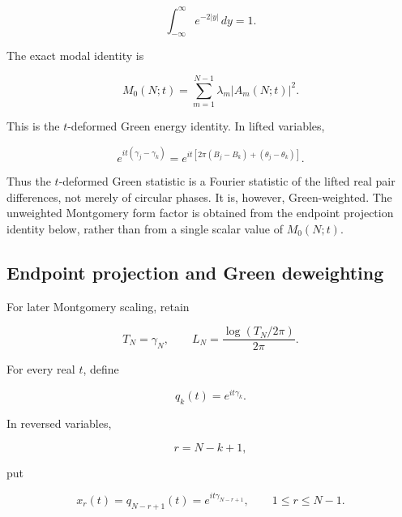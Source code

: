 \documentclass[11pt]{amsart}
\numberwithin{equation}{section}
\theoremstyle{plain}
\theoremstyle{definition}
\theoremstyle{remark}
\begin{document}
\begin{equation}
\int_{-\infty}^{\infty}e^{-2|y|}\,dy=1.
\end{equation}

The exact modal identity is

\begin{equation}
M_0(N;t)
=
\sum_{m=1}^{N-1}
\lambda_m
|A_m(N;t)|^2.
\label{eq:t_deformed_green_modal_identity}
\end{equation}

This is the \(t\)-deformed Green energy identity. In lifted variables,

\begin{equation}
e^{it(\gamma_j-\gamma_k)}
=
e^{it[2\pi(B_j-B_k)+(\theta_j-\theta_k)]}.
\label{eq:t_family_lifted_fourier_phase}
\end{equation}

Thus the \(t\)-deformed Green statistic is a Fourier statistic of the
lifted real pair differences, not merely of circular phases. It is,
however, Green-weighted. The unweighted Montgomery form factor is
obtained from the endpoint projection identity below, rather than from a
single scalar value of \(M_0(N;t)\).

\subsection{Endpoint projection and Green deweighting}
\label{subsec:endpoint_projection_green_deweighting}

For later Montgomery scaling, retain

\begin{equation}
T_N=\gamma_N,
\qquad
L_N=\frac{\log(T_N/2\pi)}{2\pi}.
\label{eq:form_factor_TN_LN}
\end{equation}

For every real \(t\), define

\begin{equation}
q_k(t)=e^{it\gamma_k}.
\label{eq:form_factor_qk_t}
\end{equation}

In reversed variables,

\begin{equation}
r=N-k+1,
\label{eq:form_factor_reversed_index}
\end{equation}

put

\begin{equation}
x_r(t)
=
q_{N-r+1}(t)
=
e^{it\gamma_{N-r+1}},
\qquad
1\le r\le N-1.
\label{eq:form_factor_reversed_phase_vector}
\end{equation}
\end{document}
